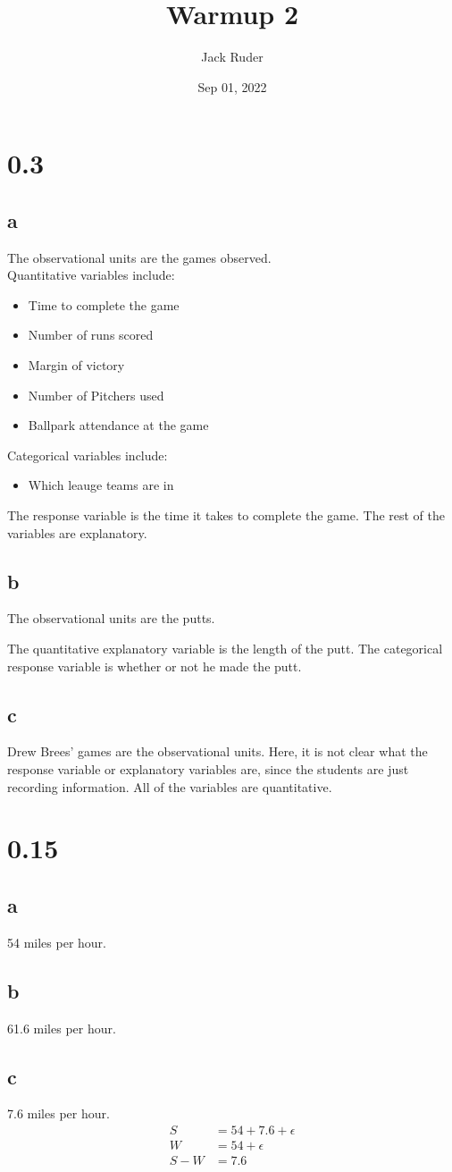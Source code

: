 \documentclass[a4paper]{article}
\title{Warmup 2}
\date{Sep 01, 2022}
\author{Jack Ruder}
\begin{document}
\doublespacing
\maketitle

\section*{0.3}%
\label{sec:0.3}
\subsection*{a}%
\label{sub:a}

The observational units are the games observed.
\\
\noindent
Quantitative variables include:
\begin{itemize}
	\item Time to complete the game
	\item Number of runs scored
	\item Margin of victory
	\item Number of Pitchers used
	\item Ballpark attendance at the game
\end{itemize}
\noindent
Categorical variables include:
\begin{itemize}
	\item Which leauge teams are in
\end{itemize}
\noindent
The response variable is the time it takes to complete the game.
The rest of the variables are explanatory.

\subsection*{b}
The observational units are the putts.

The quantitative explanatory variable is the length of the putt.
The categorical response variable is whether or not he made the putt.

\subsection*{c}

Drew Brees' games are the observational units. Here, it is not clear what the response variable or explanatory variables are, since the students are just recording information. All of the variables are quantitative.

\section*{0.15}
\subsection*{a}%
\label{sub:a}
54 miles per hour.
\subsection*{b}
\label{sub:b}
61.6 miles per hour.

\subsection*{c}
7.6 miles per hour.
\begin{align*}
	S &= 54 + 7.6 + \epsilon \\
	W &= 54 + \epsilon \\
	S - W &= 7.6 \\
\end{align*}
\end{document}
